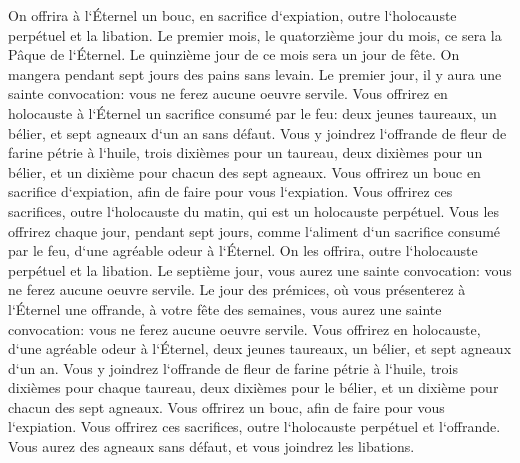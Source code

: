 \verse On offrira à l`Éternel un bouc, en sacrifice d`expiation, outre l`holocauste perpétuel et la libation. 
\verse Le premier mois, le quatorzième jour du mois, ce sera la Pâque de l`Éternel. 
\verse Le quinzième jour de ce mois sera un jour de fête. On mangera pendant sept jours des pains sans levain. 
\verse Le premier jour, il y aura une sainte convocation: vous ne ferez aucune oeuvre servile. 
\verse Vous offrirez en holocauste à l`Éternel un sacrifice consumé par le feu: deux jeunes taureaux, un bélier, et sept agneaux d`un an sans défaut. 
\verse Vous y joindrez l`offrande de fleur de farine pétrie à l`huile, trois dixièmes pour un taureau, deux dixièmes pour un bélier, 
\verse et un dixième pour chacun des sept agneaux. 
\verse Vous offrirez un bouc en sacrifice d`expiation, afin de faire pour vous l`expiation. 
\verse Vous offrirez ces sacrifices, outre l`holocauste du matin, qui est un holocauste perpétuel. 
\verse Vous les offrirez chaque jour, pendant sept jours, comme l`aliment d`un sacrifice consumé par le feu, d`une agréable odeur à l`Éternel. On les offrira, outre l`holocauste perpétuel et la libation. 
\verse Le septième jour, vous aurez une sainte convocation: vous ne ferez aucune oeuvre servile. 
\verse Le jour des prémices, où vous présenterez à l`Éternel une offrande, à votre fête des semaines, vous aurez une sainte convocation: vous ne ferez aucune oeuvre servile. 
\verse Vous offrirez en holocauste, d`une agréable odeur à l`Éternel, deux jeunes taureaux, un bélier, et sept agneaux d`un an. 
\verse Vous y joindrez l`offrande de fleur de farine pétrie à l`huile, trois dixièmes pour chaque taureau, deux dixièmes pour le bélier, 
\verse et un dixième pour chacun des sept agneaux. 
\verse Vous offrirez un bouc, afin de faire pour vous l`expiation. 
\verse Vous offrirez ces sacrifices, outre l`holocauste perpétuel et l`offrande. Vous aurez des agneaux sans défaut, et vous joindrez les libations. 

